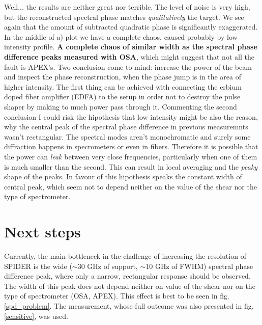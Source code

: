 \documentclass{article}
\begin{document}
Well... the results are neither great nor terrible. The level of noise is very high, but the reconstructed spectral phase matches \emph{qualitatively} the target. We see again that the amount of subtracted quadratic phase is significantly exaggerated. In the middle of a) plot we have a complete chaos, caused probably by low intensity profile. \textbf{A complete chaos of similar width as the spectral phase difference peaks measured with OSA}, which might suggest that not all the fault is APEX's. Two conclusion come to mind: increase the power of the beam and inspect the phase reconstruction, when the phase jump is in the area of higher intensity. The first thing can be achieved with connecting the erbium doped fiber amplifier (EDFA) to the setup in order not to destroy the pulse shaper by making to much power pass through it. Commenting the second conclusion I could risk the hipothesis that low intensity might be also the reason, why the central peak of the spectral phase difference in previous measuremnts wasn't rectangular. The spectral modes aren't monochromatic and surely some diffraction happens in specrometers or even in fibers. Therefore it is possible that the power can \emph{leak} between very close frequencies, particularly when one of them is much smaller than the second. This can result in local averaging and the \emph{peaky} shape of the peaks. In favour of this hipothesis speaks the constant width of central peak, which seem not to depend neither on the value of the shear nor the type of spectrometer.

\pagebreak

\section{Next steps}

Currently, the main bottleneck in the challenge of increasing the resolution of SPIDER is the wide ($\sim$30 GHz of support, $\sim$10 GHz of FWHM) spectral phase difference peak, where only a narrow, rectangular response should be observed. The width of this peak does not depend neither on value of the shear nor on the type of spectrometer (OSA, APEX). This effect is best to be seen in fig. \ref{spd_problem}. The measurement, whose full outcome was also presented in fig. \ref{sensitive}, was used.
\end{document}
